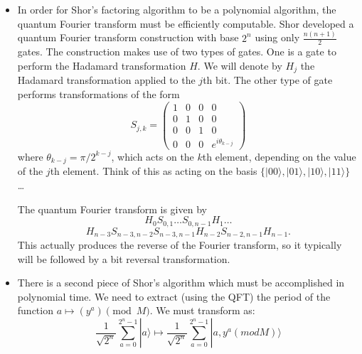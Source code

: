 \documentclass{article}
\def\pagedone{\newpage}
\def\ket#1{|{#1}\rangle}
\begin{document}
\begin{itemize}


	\item In order for Shor's factoring algorithm to be a polynomial algorithm, the quantum
Fourier transform must be efficiently computable. Shor
developed a quantum Fourier transform construction with base $2^n$ using
only $\frac{n(n+1)}{2}$ gates. The construction makes use of two types of
gates. One is a gate to perform the Hadamard transformation $H$. 
We will denote by $H_j$ the Hadamard transformation applied to the $j$th
bit. The other type of gate performs transformations of the form
$$S_{j,k} = \left(\begin{array}{cccc}1&0&0&0\\0&1&0&0\\0&0&1&0\\0&0&0&e^{i\theta_{k-j}}\end{array}\right)$$
where $\theta_{k-j}={\pi}/{2^{k-j}}$, which acts on the $k$th element,
depending on the value of the $j$th element.  Think of this as acting on the basis $\{\ket{00},\ket{01},\ket{10},\ket{11}\}$ \ldots

The quantum Fourier transform is given by 
$$H_0S_{0,1}\dots S_{0,n-1}H_1\dots$$
$$H_{n-3}S_{n-3,n-2}S_{n-3,n-1}H_{n-2}S_{n-2,n-1}H_{n-1}.$$
This actually produces the reverse of the Fourier transform, so it typically will be followed by a bit reversal transformation.
\pagedone
	\item There is a second piece of Shor's algorithm which must be accomplished in polynomial time.  We need to extract (using the QFT) the period of the function $a \mapsto (y^a)\pmod M$.
We must transform as:
$$\frac{1}{\sqrt{2^n}}\sum_{a=0}^{2^n-1}\ket a \mapsto \frac{1}{\sqrt{2^n}}\sum_{a=0}^{2^n-1}\ket{a,y^a(mod M)}$$


\end{itemize}
\end{document}

